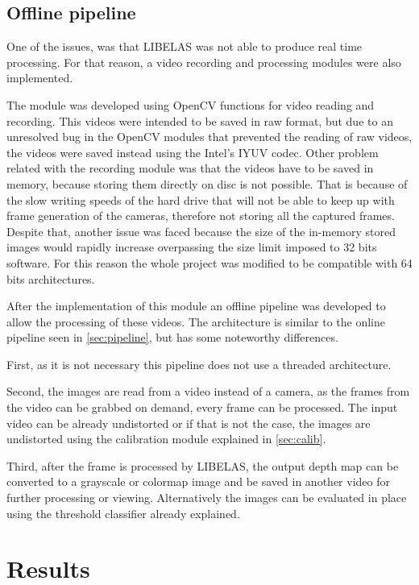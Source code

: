 \documentclass[10pt,a4paper,twocolumn,twoside]{article}
\begin{document}
	\subsection{Offline pipeline}
	One of the issues, was that LIBELAS was not able to produce real time processing. For that reason, a video recording and processing modules were also implemented.  
	
	The module was developed using OpenCV functions for video reading and recording. This videos were intended to be saved in raw format, but due to an unresolved bug in the OpenCV modules that prevented the reading of raw videos, the videos were saved instead using the Intel's IYUV codec. %
	Other problem related with the recording module was that the videos have to be saved in memory, because storing them directly on disc is not possible. That is because of the slow writing speeds of the hard drive that will not be able to keep up with frame generation of the cameras, therefore not storing all the captured frames. Despite that, another issue was faced because the size of the in-memory stored images would rapidly increase overpassing the size limit imposed to 32 bits software. For this reason the whole project was modified to be compatible with 64 bits architectures.
	
	After the implementation of this module an offline pipeline was developed to allow the processing of these videos. The architecture is similar to the online pipeline seen in \ref{sec:pipeline}, but has some noteworthy differences.  
	
	First, as it is not necessary this pipeline does not use a threaded architecture.
	
	Second, the images are read from a video instead of a camera, as the frames from the video can be grabbed on demand, every frame can be processed. The input video can be already undistorted or if that is not the case, the images are undistorted using the calibration module explained in \ref{sec:calib}. 
	
	Third, after the frame is processed by LIBELAS, the output depth map can be converted to a grayscale or colormap image and be saved in another video for further processing or viewing. Alternatively the images can be evaluated in place using the threshold classifier already explained.  
	

	
	\section{Results}
	
\end{document}
